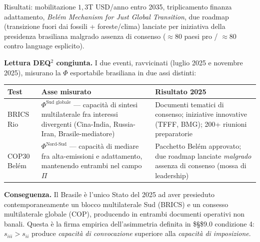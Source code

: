 Risultati: mobilitazione \(1{,}3\)T USD/anno entro 2035, triplicamento
finanza adattamento, \emph{Belém Mechanism for Just Global Transition},
due roadmap (transizione fuori dai fossili + foreste/clima) lanciate per
iniziativa della presidenza brasiliana malgrado assenza di consenso
(\(\approx 80\) paesi pro / \(\approx 80\) contro language esplicito).

\Hypoth{} \textbf{Lettura DEQ$^2$ congiunta.} I due eventi, ravvicinati
(luglio 2025 e novembre 2025), misurano la \(\Phi\) esportabile
brasiliana in due assi distinti:

{\def\LTcaptype{none} %
{\small\begin{longtable}[]{@{}
  >{\raggedright\arraybackslash}p{}
  >{\raggedright\arraybackslash}p{}
  >{\raggedright\arraybackslash}p{}@{}}
\toprule\noalign{}
\begin{minipage}[b]{\linewidth}\raggedright
Test
\end{minipage} & \begin{minipage}[b]{\linewidth}\raggedright
Asse misurato
\end{minipage} & \begin{minipage}[b]{\linewidth}\raggedright
Risultato 2025
\end{minipage} \\
\midrule\noalign{}
\endhead
\bottomrule\noalign{}
\endlastfoot
BRICS Rio & \(\Phi^{\text{Sud globale}}\) --- capacità di sintesi
multilaterale fra interessi divergenti (Cina-India, Russia-Iran,
Brasile-mediatore) & Documenti tematici di consenso; iniziative
innovative (TFFF, BMG); 200+ riunioni preparatorie \\
COP30 Belém & \(\Phi^{\text{Nord-Sud}}\) --- capacità di mediare fra
alta-emissioni e adattamento, mantenendo entrambi nel campo \(\Pi\) &
Pacchetto Belém approvato; due roadmap lanciate \emph{malgrado} assenza
di consenso (mossa di leadership) \\
\end{longtable}}
}

\Proved{} \textbf{Conseguenza.} Il Brasile è l'unico Stato del 2025 ad
aver presieduto contemporaneamente un blocco multilaterale Sud (BRICS) e
un consesso multilaterale globale (COP), producendo in entrambi
documenti operativi non banali. Questa è la firma empirica
dell'asimmetria definita in \$\S\$9.0 condizione 4: \(s_{iii} > s_{ii}\)
produce \emph{capacità di convocazione} superiore alla \emph{capacità di
imposizione}.

